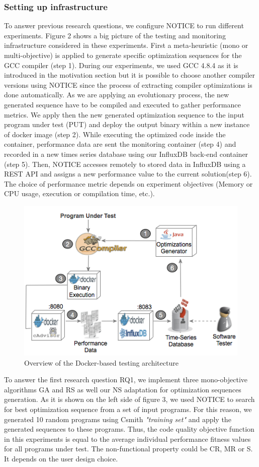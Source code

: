 \subsubsection{Setting up infrastructure}
To answer previous research questions, we configure NOTICE to run different experiments. Figure 2 shows a big picture of the testing and monitoring infrastructure considered in these experiments. 
First a meta-heuristic (mono or multi-objective) is applied to generate specific optimization sequences for the GCC compiler (step 1). During our experiments, we used GCC 4.8.4 as it is introduced in the motivation section but it is possible to choose another compiler versions using NOTICE since the process of extracting compiler optimizations is done automatically. As we are applying an evolutionary process, the new generated sequence have to be compiled and executed to gather performance metrics. We apply then the new generated optimization sequence to the input program under test (PUT) and deploy the output binary within a new instance of docker image (step 2). While executing the optimized code inside the container, performance data are sent the monitoring container (step 4) and recorded in a new times series database using our InfluxDB back-end container (step 5). Then, NOTICE accesses remotely to stored data in InfluxDB using a REST API and assigns a new performance value to the current solution(step 6). The choice of performance metric depends on experiment objectives (Memory or CPU usage, execution or compilation time, etc.).
\begin{figure}[h]
	\centering
	\includegraphics[width=0.9\linewidth]{Ressources/infraup.png}
	\caption{Overview of the Docker-based testing architecture}
\end{figure}
To answer the first research question RQ1, we implement three mono-objective algorithms GA and RS as well our NS adaptation for optimization sequences generation. As it is shown on the left side of figure 3, we used NOTICE to search for best optimization sequence from a set of input programs. For this reason, we generated 10 random programs using Csmith \textit{"training set"} and apply the generated sequences to these programs. Thus, the code quality objective function in this
experiments is equal to the average individual performance fitness values for all programs under test. The non-functional property could be CR, MR or S. It depends on the user design choice.


